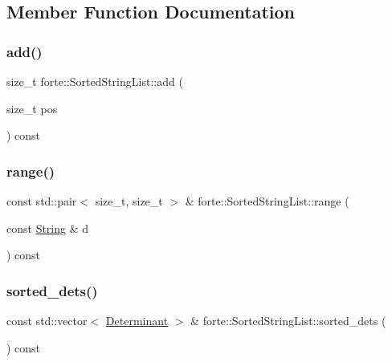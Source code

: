 \subsection{Member Function Documentation}
\mbox{\label{classforte_1_1_sorted_string_list_af3ddb6fb4047bf4db17911b24c966f7f}} 
\subsubsection{\texorpdfstring{add()}{add()}}
{\footnotesize\ttfamily size\+\_\+t forte\+::\+Sorted\+String\+List\+::add (\begin{DoxyParamCaption}\item[{size\+\_\+t}]{pos }\end{DoxyParamCaption}) const}

\mbox{\label{classforte_1_1_sorted_string_list_ac46d5fa00476a9525b4cdbdcaa5aa4f8}} 
\subsubsection{\texorpdfstring{range()}{range()}}
{\footnotesize\ttfamily const std\+::pair$<$ size\+\_\+t, size\+\_\+t $>$ \& forte\+::\+Sorted\+String\+List\+::range (\begin{DoxyParamCaption}\item[{const \mbox{\hyperlink{namespaceforte_a840d1bfd3a8b3c16e09979212f37313f}{String}} \&}]{d }\end{DoxyParamCaption}) const}

\mbox{\label{classforte_1_1_sorted_string_list_a62557c1c45fec5ae4e833e7787a8aed5}} 
\subsubsection{\texorpdfstring{sorted\+\_\+dets()}{sorted\_dets()}}
{\footnotesize\ttfamily const std\+::vector$<$ \mbox{\hyperlink{namespaceforte_a2076c63fd7b8732004d9e1442ce527c1}{Determinant}} $>$ \& forte\+::\+Sorted\+String\+List\+::sorted\+\_\+dets (\begin{DoxyParamCaption}{ }\end{DoxyParamCaption}) const}

